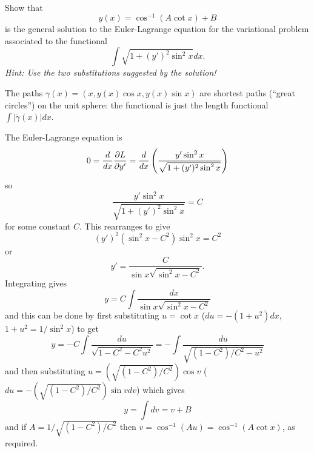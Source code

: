 \documentclass[12pt]{article}
\begin{document}

\newpage

\begin{question}\ \\
Show that
\[y(x)=\cos^{-1}(A\cot x)+B\]
is the general solution to the Euler-Lagrange equation for the variational problem associated to the functional
\[\int\sqrt{1+(y')^2\sin^2x}dx.\]
{\em Hint: Use the two substitutions suggested by the solution!}
\begin{rmk}
The paths $\gamma(x)=(x,y(x)\cos x,y(x)\sin x)$ are shortest paths (``great circles'') on the unit sphere: the functional is just the length functional $\int|\dot{\gamma}(x)|dx$.
\end{rmk}
\end{question}

\bigskip

\iffalse
\begin{answer}
The Euler-Lagrange equation is
\[0=\dfrac{d }{d x}\dfrac{\partial L}{\partial y'}=\dfrac{d }{d x}\left(\frac{y'\sin^2x}{\sqrt{1+(y')^2\sin^2x}}\right)\]
so
\[\frac{y'\sin^2x}{\sqrt{1+(y')^2\sin^2x}}=C\]
for some constant $C$. This rearranges to give
\[(y')^2(\sin^2x-C^2)\sin^2x=C^2\]
or
\[y'=\frac{C}{\sin x\sqrt{\sin^2x-C^2}}.\]
Integrating gives
\[y=C\int\frac{dx}{\sin x\sqrt{\sin^2x-C^2}}\]
and this can be done by first substituting $u=\cot x$ ($du=-(1+u^2)dx$, $1+u^2=1/\sin^2x$) to get
\[y=-C\int\frac{du}{\sqrt{1-C^2-C^2u^2}}=-\int\frac{du}{\sqrt{(1-C^2)/C^2-u^2}}\]
and then substituting $u=\left(\sqrt{(1-C^2)/C^2}\right)\cos v$ ($du=-\left(\sqrt{(1-C^2)/C^2}\right)\sin vdv$) which gives
\[y=\int dv=v+B\]
and if $A=1/\sqrt{(1-C^2)/C^2}$ then $v=\cos^{-1}(Au)=\cos^{-1}(A\cot x)$, as required.
\end{answer}
\end{document}
